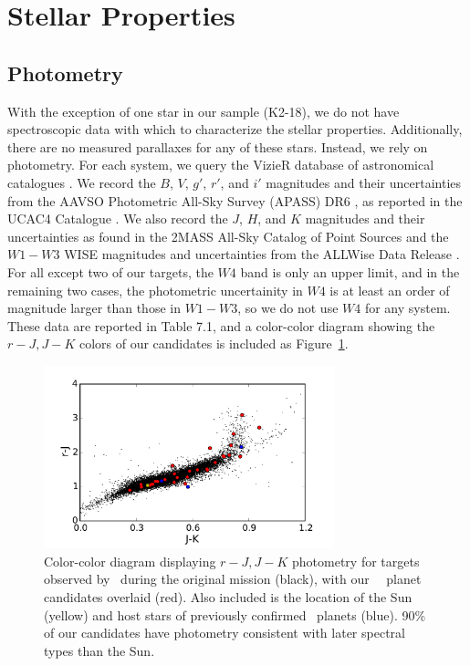 \section{Stellar Properties}
\subsection{Photometry}

With the exception of one star in our sample (K2-18), we do not have
spectroscopic data with which to characterize the stellar properties.
Additionally, there are no measured parallaxes for any of these stars.
Instead, we rely on photometry.
For each system, we query the VizieR database of astronomical catalogues
\citep{Ochseinbein00}.
We record the $B$, $V$, $g'$, $r'$, and $i'$ magnitudes and their
uncertainties from the AAVSO Photometric All-Sky Survey (APASS) DR6
\citep{Henden14}, as reported in the UCAC4 Catalogue \citep{Zacharias12}.
We also record the $J$, $H$, and $K$ magnitudes and their uncertainties
as found in the 2MASS All-Sky Catalog of Point Sources \citep{Cutri03}
and the $W1-W3$ WISE magnitudes and uncertainties from the ALLWise Data
Release \citep{Cutri13}.
For all except two of our targets, the $W4$ band is only an upper limit,
and in the remaining two cases, the photometric uncertainity in $W4$ is at least an
order of magnitude larger than those in $W1-W3$, so we do not use $W4$
for any system.
These data are reported in Table 7.1, and a color-color diagram showing the
$r-J, J-K$ colors of our candidates is included as Figure~\ref{fig:photometry}.

\begin{figure}[htbp]
\centerline{\includegraphics[width=0.75\textwidth]{chapter7/f1.pdf}}
\caption[Color-color diagram showing \kep\ targets with our own \KT\ planet candidates overlaid.]
{Color-color diagram displaying $r-J, J-K$ photometry for targets
observed by \kep\ during the original
mission (black), with our \KT\ \Ci\ planet candidates overlaid (red).
Also included is the location of the Sun (yellow) and host stars of previously
confirmed \KT\ planets (blue).
90\% of our candidates have photometry consistent with later spectral
types than the Sun.}
\label{fig:photometry}
\end{figure}


